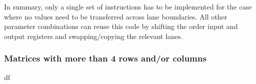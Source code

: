 In summary, only a single set of instructions has to be implemented for the case where no values need to be transferred across lane boundaries.
All other parameter combinations can reuse this code by shifting the order input and output registers and swapping/copying the relevant lanes.



\subsubsection{Matrices with more than 4 rows and/or columns}
\label{sec:Implementation_general_multi_lane_matrices} 
df

